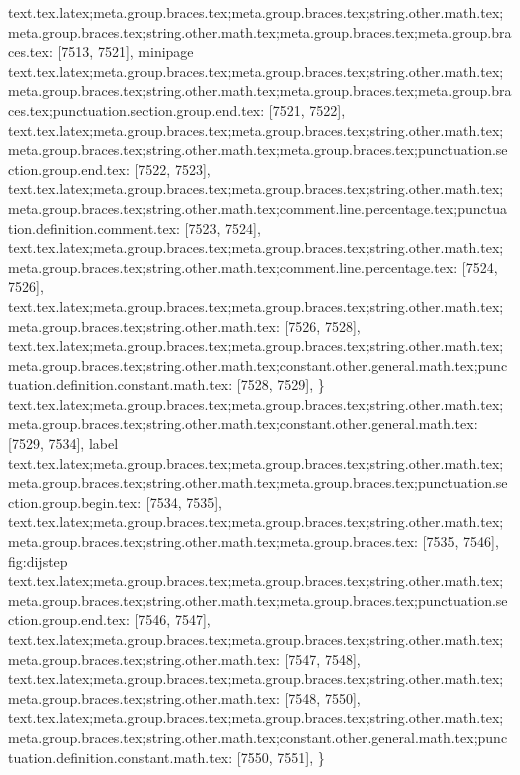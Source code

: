 {{{{{{{{{{{{{{{{{{{{{{{{{{{{{{{{{{{{{{{{{{{{{{{{{{{{{{{{{{{{{{{{{{{{{{{{{{{{{{{{{{{{{{{{{{{{{{{{{{{{{{{{{{{{{{{{{{{{{{{{{{{{{{{{{{{{{{{{{{{{{{{{{{{{{{{{{{{{{{{{{{{{{{{{{{{{{{{{{{{{{{{{{{{{{{{{{{{{{{{{{{{{{text.tex.latex;meta.group.braces.tex;meta.group.braces.tex;string.other.math.tex;meta.group.braces.tex;string.other.math.tex;meta.group.braces.tex;meta.group.braces.tex: [7513, 7521], {minipage}
text.tex.latex;meta.group.braces.tex;meta.group.braces.tex;string.other.math.tex;meta.group.braces.tex;string.other.math.tex;meta.group.braces.tex;meta.group.braces.tex;punctuation.section.group.end.tex: [7521, 7522], {}}
text.tex.latex;meta.group.braces.tex;meta.group.braces.tex;string.other.math.tex;meta.group.braces.tex;string.other.math.tex;meta.group.braces.tex;punctuation.section.group.end.tex: [7522, 7523], {}}
text.tex.latex;meta.group.braces.tex;meta.group.braces.tex;string.other.math.tex;meta.group.braces.tex;string.other.math.tex;comment.line.percentage.tex;punctuation.definition.comment.tex: [7523, 7524], {%
text.tex.latex;meta.group.braces.tex;meta.group.braces.tex;string.other.math.tex;meta.group.braces.tex;string.other.math.tex;comment.line.percentage.tex: [7524, 7526], {%
}
text.tex.latex;meta.group.braces.tex;meta.group.braces.tex;string.other.math.tex;meta.group.braces.tex;string.other.math.tex: [7526, 7528], {  }
text.tex.latex;meta.group.braces.tex;meta.group.braces.tex;string.other.math.tex;meta.group.braces.tex;string.other.math.tex;constant.other.general.math.tex;punctuation.definition.constant.math.tex: [7528, 7529], {\}
text.tex.latex;meta.group.braces.tex;meta.group.braces.tex;string.other.math.tex;meta.group.braces.tex;string.other.math.tex;constant.other.general.math.tex: [7529, 7534], {label}
text.tex.latex;meta.group.braces.tex;meta.group.braces.tex;string.other.math.tex;meta.group.braces.tex;string.other.math.tex;meta.group.braces.tex;punctuation.section.group.begin.tex: [7534, 7535], {{}
text.tex.latex;meta.group.braces.tex;meta.group.braces.tex;string.other.math.tex;meta.group.braces.tex;string.other.math.tex;meta.group.braces.tex: [7535, 7546], {fig:dijstep}
text.tex.latex;meta.group.braces.tex;meta.group.braces.tex;string.other.math.tex;meta.group.braces.tex;string.other.math.tex;meta.group.braces.tex;punctuation.section.group.end.tex: [7546, 7547], {}}
text.tex.latex;meta.group.braces.tex;meta.group.braces.tex;string.other.math.tex;meta.group.braces.tex;string.other.math.tex: [7547, 7548], {
}
text.tex.latex;meta.group.braces.tex;meta.group.braces.tex;string.other.math.tex;meta.group.braces.tex;string.other.math.tex: [7548, 7550], {  }
text.tex.latex;meta.group.braces.tex;meta.group.braces.tex;string.other.math.tex;meta.group.braces.tex;string.other.math.tex;constant.other.general.math.tex;punctuation.definition.constant.math.tex: [7550, 7551], {\}
}}}}}}}}}}}}}}}}}}}}}}}}}}}}}}}}}}}}}}}}}}}}}}}}}}}}}}}}}}}}}}}}}}}}}}}}}}}}}}}}}}}}}}}}}}}}}}}}}}}}}}}}}}}}}}}}}}}}}}}}}}}}}}}}}}}}}}}}}}}}}}}}}}}}}}}}}}}}}}}}}}}}}}}}}}}}}}}}}}}}}}}}}}}}}}}}}}}}}}}}}}}}}}
